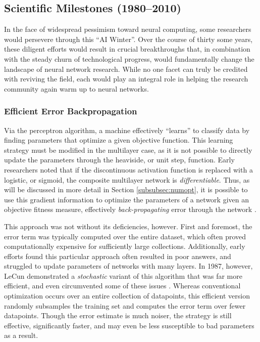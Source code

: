 \subsection{Scientific Milestones (1980--2010)}
\label{sec:advances}

In the face of widespread pessimism toward neural computing, some researchers would persevere through this ``AI Winter''.
Over the course of thirty some years, these diligent efforts would result in crucial breakthroughs that, in combination with the steady churn of technological progress, would fundamentally change the landscape of neural network research.
While no one facet can truly be credited with reviving the field, each would play an integral role in helping the research community again warm up to neural networks.

\subsubsection{Efficient Error Backpropagation}
\label{subsec:sgd}

Via the perceptron algorithm, a machine effectively ``learns'' to classify data by finding parameters that optimize a given objective function.
This learning strategy must be modified in the multilayer case, as it is not possible to directly update the parameters through the heaviside, or unit step, function.
Early researchers noted that if the discontinuous activation function is replaced with a logistic, or sigmoid, the composite multilayer network is \emph{differentiable}.
Thus, as will be discussed in more detail in Section \ref{subsubsec:numopt}, it is possible to use this gradient information to optimize the parameters of a network given an objective fitness measure, effectively \emph{back-propagating} error through the network \cite{Hinton1986}.

This approach was not without its deficiencies, however.
First and foremost, the error term was typically computed over the entire dataset, which often proved computationally expensive for sufficiently large collections.
Additionally, early efforts found this particular approach often resulted in poor answers, and struggled to update parameters of networks with many layers.
In 1987, however, LeCun demonstrated a \emph{stochastic} variant of this algorithm that was far more efficient, and even circumvented some of these issues \cite{LeCun1987}.
Whereas conventional optimization occurs over an entire collection of datapoints, this efficient version randomly subsamples the training set and computes the error term over fewer datapoints.
Though the error estimate is much noiser, the strategy is still effective, significantly faster, and may even be less susceptible to bad parameters as a result.

